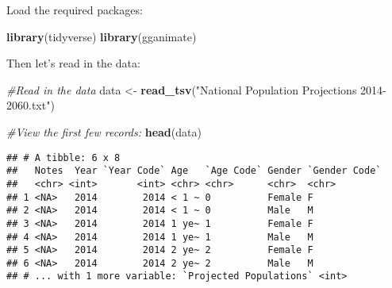 \documentclass[]{article}
\newenvironment{Shaded}{\begin{snugshade}}{\end{snugshade}}
\newcommand{\KeywordTok}[1]{\textcolor[rgb]{0.13,0.29,0.53}{\textbf{#1}}}
\newcommand{\DataTypeTok}[1]{\textcolor[rgb]{0.13,0.29,0.53}{#1}}
\newcommand{\StringTok}[1]{\textcolor[rgb]{0.31,0.60,0.02}{#1}}
\newcommand{\CommentTok}[1]{\textcolor[rgb]{0.56,0.35,0.01}{\textit{#1}}}
\newcommand{\OperatorTok}[1]{\textcolor[rgb]{0.81,0.36,0.00}{\textbf{#1}}}
\newcommand{\NormalTok}[1]{#1}
\begin{document}
Load the required packages:

\begin{Shaded}
\begin{Highlighting}[]
\KeywordTok{library}\NormalTok{(tidyverse)}
\KeywordTok{library}\NormalTok{(gganimate)}
\end{Highlighting}
\end{Shaded}

Then let's read in the data:

\begin{Shaded}
\begin{Highlighting}[]
\CommentTok{#Read in the data}
\NormalTok{data <-}\StringTok{ }\KeywordTok{read_tsv}\NormalTok{(}\StringTok{"National Population Projections 2014-2060.txt"}\NormalTok{)}

\CommentTok{#View the first few records:}
\KeywordTok{head}\NormalTok{(data)}
\end{Highlighting}
\end{Shaded}

\begin{verbatim}
## # A tibble: 6 x 8
##   Notes  Year `Year Code` Age   `Age Code` Gender `Gender Code`
##   <chr> <int>       <int> <chr> <chr>      <chr>  <chr>        
## 1 <NA>   2014        2014 < 1 ~ 0          Female F            
## 2 <NA>   2014        2014 < 1 ~ 0          Male   M            
## 3 <NA>   2014        2014 1 ye~ 1          Female F            
## 4 <NA>   2014        2014 1 ye~ 1          Male   M            
## 5 <NA>   2014        2014 2 ye~ 2          Female F            
## 6 <NA>   2014        2014 2 ye~ 2          Male   M            
## # ... with 1 more variable: `Projected Populations` <int>
\end{verbatim}

\begin{Shaded}
\end{Shaded}
\end{document}
